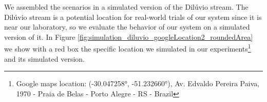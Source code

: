 
    We assembled the scenarios in a simulated version of the Dilúvio stream. The Dilúvio stream is a potential location for real-world trials of our system since it is near our laboratory, so we evaluate the behavior of our system on a simulated version of it. In Figure \ref{fig:simulation_diluvio_googleLocation2_roundedArea} we show with a red box the specific location we simulated in our experiments\footnote{Google maps location: (-30.047258°, -51.232660°), Av. Edvaldo Pereira Paiva, 1970 - Praia de Belas - Porto Alegre - RS - Brazil} and its simulated version.
     
